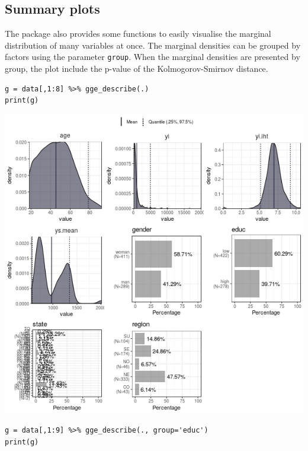 \documentclass[a4paper]{article}
\begin{document}
\subsection{Summary plots}
\label{sec:org65c30a0}

The package also provides some functions to easily visualise the marginal distribution of many variables at once. The marginal densities can be grouped by factors using the parameter \texttt{group}. When the marginal densities are presented by group, the plot include the p-value of the Kolmogorov-Smirnov distance.

\lstset{numbers=left,language=r,label= ,caption= ,captionpos=b}
\begin{lstlisting}
g = data[,1:8] %>% gge_describe(.)
print(g)
\end{lstlisting}

\begin{center}
\includegraphics[width=.9\linewidth]{gge_describe.png}
\end{center}



\lstset{numbers=left,language=r,label= ,caption= ,captionpos=b}
\begin{lstlisting}
g = data[,1:9] %>% gge_describe(., group='educ')
print(g)
\end{lstlisting}
\end{document}
